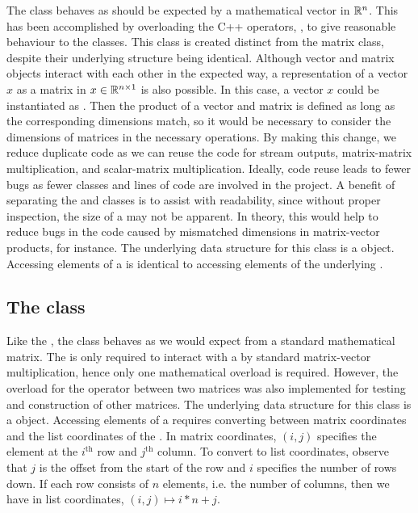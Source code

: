 The  class behaves as should be expected by a mathematical vector in $\mathbb{R}^n$.
This has been accomplished by overloading the C++ operators, \inline{+, -, *, /}, to give reasonable behaviour to the classes.
This class is created distinct from the matrix class, despite their underlying structure being identical.
Although vector and matrix objects interact with each other in the expected way, a representation of a vector $x$ as a matrix in $x\in\mathbb{R}^{n\times 1}$ is also possible.
In this case, a vector $x$ could be instantiated as .
Then the product of a vector and matrix is defined as long as the corresponding dimensions match, so it would be necessary to consider the dimensions of matrices in the necessary operations.
By making this change, we reduce duplicate code as we can reuse the code for stream outputs, matrix-matrix multiplication, and scalar-matrix multiplication.
Ideally, code reuse leads to fewer bugs as fewer classes and lines of code are involved in the project.
A benefit of separating the  and  classes is to assist with readability, since without proper inspection, the size of a  may not be apparent.
In theory, this would help to reduce bugs in the code caused by mismatched dimensions in matrix-vector products, for instance.
The underlying data structure for this class is a  object.
Accessing elements of a  is identical to accessing elements of the underlying .

\subsection{The  class}

Like the , the  class behaves as we would expect from a standard mathematical matrix. 
The  is only required to interact with a  by standard matrix-vector multiplication, hence only one mathematical overload is required.
However, the overload for the \inline{+} operator between two matrices was also implemented for testing and construction of other matrices.
The underlying data structure for this class is a  object.
Accessing elements of a  requires converting between matrix coordinates and the list coordinates of the .
In matrix coordinates, $(i,j)$ specifies the element at the $i^\mathrm{th}$ row and $j^\mathrm{th}$ column.
To convert to list coordinates, observe that $j$ is the offset from the start of the row and $i$ specifies the number of rows down.
If each row consists of $n$ elements, i.e. the number of columns, then we have in list coordinates, $(i,j) \mapsto i*n + j$.

